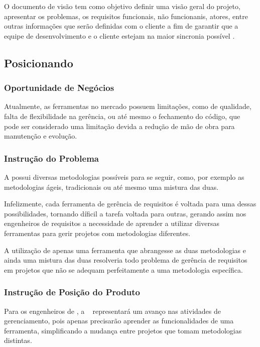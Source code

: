 
O documento de visão tem como objetivo definir uma visão geral do projeto, apresentar os problemas, os requisitos funcionais, não funcionanis, atores, entre outras informações que serão definidas com o cliente a fim de garantir que a equipe de desenvolvimento e o cliente estejam na maior sincronia possível \cite{IBM:2014:Online}.

\subsection{Posicionando}
\subsubsection{Oportunidade de Negócios}

Atualmente, as ferramentas no mercado possuem limitações, como de qualidade, falta de flexibilidade na gerência, ou até mesmo o fechamento do código, que pode ser considerado uma limitação devida a redução de mão de obra para manutenção e evolução.

\subsubsection{Instrução do Problema}

A \er{} possui diversas metodologias possíveis para se seguir, como, por exemplo as metodologias ágeis, tradicionais ou até mesmo uma mistura das duas.

Infelizmente, cada ferramenta de gerência de requisitos é voltada para uma dessas possibilidades, tornando díficil a tarefa voltada para outras, gerando assim nos engenheiros de requisitos a necessidade de aprender a utilizar diversas ferramentas para gerir projetos com metodologias diferentes.

A utilização de apenas uma ferramenta que abrangesse as duas metodologias e ainda uma mistura das duas resolveria todo problema de gerência de requisitos em projetos que não se adequam perfeitamente a uma metodologia específica.

\subsubsection{Instrução de Posição do Produto}

Para os engenheiros de \er, a \nomeferramenta~ representará um avanço nas atividades de gerenciamento, pois apenas precisarão aprender as funcionalidades de uma ferramenta, simplificando a mudança entre projetos que tomam metodologias distintas.

